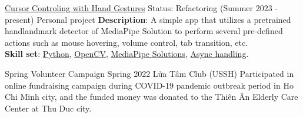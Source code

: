 \documentclass{src/preamble/doc_class}
\begin{document}
	\begin{SecondaryMainBar}{\ColorBackground}{\ColorTextSide}
	\end{SecondaryMainBar}
	
	\begin{SecondaryMainPart}
		\Experience
  		{\ColorHighlight}
  		{\href{https://github.com/diligent-man/Cursor-controlling-with-hand-gestures/tree/main}{Cursor Controling with Hand Gestures}}
  		{Status: Refactoring (Summer 2023 - present)}
  		{Personal project}
  		{
			\textbf{Description}: A simple app that utilizes a pretrained handlandmark detector of MediaPipe Solution to perform several pre-defined actions such as mouse hovering, volume control, tab transition, etc.\\
			
			\vspace{.15cm}
			\textbf{Skill set}: \href{https://www.python.org/}{Python}, \href{https://opencv.org/}{OpenCV}, \href{https://ai.google.dev/edge/mediapipe/solutions/guide}{MediaPipe Solutions}, \href{https://docs.python.org/3/library/asyncio.html}{Async handling}.
		}
		\vspace{.35cm}
		
		\Experience
		{\ColorHighlight}
		{Spring Volunteer Campaign}
		{Spring 2022}
		{Lửa Tâm Club (USSH)}
		{
			Participated in online fundraising campaign during COVID-19 pandemic outbreak period in Ho Chi Minh city, and the funded money was donated to the Thiên Ân Elderly Care Center at Thu Duc city.
		}		
	\end{SecondaryMainPart}
\end{document}

